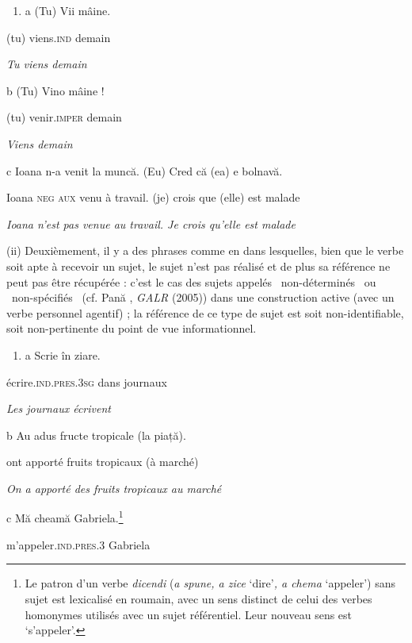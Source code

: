 \begin{enumerate}
\item a  (Tu)  Vii  mâine.  


\end{enumerate}
(tu)  viens.\textsc{ind}  demain

{\itshape
Tu viens demain}

b  (Tu)  Vino  mâine !

(tu)  venir.\textsc{imper}  demain

{\itshape
Viens demain}

c  Ioana n-a venit la muncă. (Eu) Cred că (ea) e bolnavă.

Ioana \textsc{neg aux} venu à travail. (je) crois que (elle) est malade

{\itshape
Ioana n'est pas venue au travail. Je crois qu'elle est malade}

(ii) Deuxièmement, il y a des phrases comme en  dans lesquelles, bien que le verbe soit apte à recevoir un sujet, le sujet n'est pas réalisé et de plus sa référence ne peut pas être récupérée : c'est le cas des sujets appelés {\guillemotleft}~non-déterminés~{\guillemotright} ou {\guillemotleft}~non-spécifiés~{\guillemotright} (cf. Pană \citet{Dindelegan2003}, \textit{GALR} (2005)) dans une construction active (avec un verbe personnel agentif) ; la référence de ce type de sujet est soit non-identifiable, soit non-pertinente du point de vue informationnel.


\begin{enumerate}
\item \label{bkm:Ref307434626}a  Scrie  în  ziare.  


\end{enumerate}
écrire.\textsc{ind.pres.3sg } dans  journaux

{\itshape
Les journaux écrivent}

b  Au  adus  fructe  tropicale  (la piață).

ont  apporté  fruits  tropicaux  (à marché)

  \textit{On a apporté des fruits tropicaux au marché}

c  Mă cheamă Gabriela.\footnote{Le patron d'un verbe \textit{dicendi} (\textit{a spune, a zice} `dire'\textit{, a chema} `appeler') sans sujet est lexicalisé en roumain, avec un sens distinct de celui des verbes homonymes utilisés avec un sujet référentiel. Leur nouveau sens est `s'appeler'.}

m'appeler.\textsc{ind.pres.3} Gabriela


